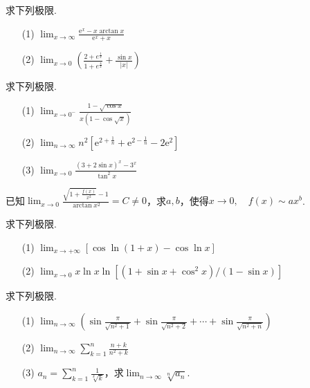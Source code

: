 \begin{xiti}
\begin{solution}
\end{solution}
\item 求下列极限.
\begin{enumerate}
	\item[(1)] $\lim _ { x \rightarrow \infty } \frac { \mathrm { e } ^ { x } - x \arctan x } { \mathrm { e } ^ { x } + x }$
	\item[(2)] $\lim _ { x \rightarrow 0 } \left( \frac { 2 + e ^ { \frac { 1 } { x } } } { 1 + e ^ { \frac { 4 } { x } } } + \frac { \sin x } { | x | } \right)$
\end{enumerate}
\item 求下列极限.
\begin{enumerate}
	\item[(1)] $\lim _ { x \rightarrow 0 ^ { - } } \frac { 1 - \sqrt { \cos x } } { x ( 1 - \cos \sqrt { x } ) }$
	\item[(2)] $\lim _ { n \rightarrow \infty } n ^ { 2 } \left[ \mathrm { e } ^ { 2 + \frac { 1 } { n } } + \mathrm { e } ^ { 2 - \frac { 1 } { n } } - 2 \mathrm { e } ^ { 2 } \right]$
	\item[(3)] $\lim _ { x \rightarrow 0 } \frac { ( 3 + 2 \sin x ) ^ { x } - 3 ^ { x } } { \tan ^ { 2 } x }$
\end{enumerate}
\item 已知$\lim _ { x \rightarrow 0 } \frac { \sqrt { 1 + \frac { f ( x ) } { x ^ { 2 } } } - 1 } { \arctan x ^ { 2 } } = C \neq 0$，求$a,b$，使得$x \rightarrow 0 , \quad f ( x ) \sim a x ^ { b }$.
\item 求下列极限.
\begin{enumerate}
	\item[(1)] $\lim _ { x \rightarrow + \infty } [ \cos \ln ( 1 + x ) - \cos \ln x ]$
	\item[(2)] $\lim _ { x \rightarrow 0 } x \ln x \ln \left[ \left( 1 + \sin x + \cos ^ { 2 } x \right) / ( 1 - \sin x ) \right]$
\end{enumerate}
\item 求下列极限.
\begin{enumerate}
	\item[(1)] $\lim _ { n \rightarrow \infty } \left( \sin \frac { \pi } { \sqrt { n ^ { 2 } + 1 } } + \sin \frac { \pi } { \sqrt { n ^ { 2 } + 2 } } + \cdots + \sin \frac { \pi } { \sqrt { n ^ { 2 } + n } } \right)$
	\item[(2)] $\lim _ { n \rightarrow \infty } \sum _ { k = 1 } ^ { n } \frac { n + k } { n ^ { 2 } + k }$
	\item[(3)] $a _ { n } = \sum _ { k = 1 } ^ { n } \frac { 1 } { \sqrt [ k ] { k } }$，求$\lim _ { n \rightarrow \infty } \sqrt [ n ] { a _ { n } }$.

\end{enumerate}
\end{xiti}
